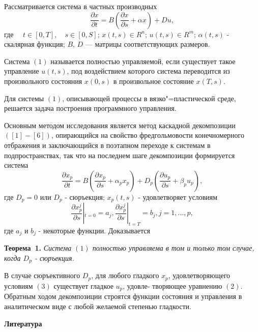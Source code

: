 \vzmscaption

 Рассматривается система в частных производных
\begin{equation}
\frac{\partial x}{\partial t}=B(\frac{\partial x}{\partial s}+ \alpha x) + Du,
\end{equation}
 где $\quad t\in [0,T],\quad s\in [0,S]$; $x(t,s)\in R ^{n}$; $u(t,s)\in R^{m}$; $\alpha(t,s)$ - скалярная функция; $B$, $D$ --- матрицы соответствующих размеров.

Система $(1)$ называется полностью управляемой, если существует такое управление $u(t,s)$,
под воздействием которого система переводится  из произвольного состояния $x(0,s)$ в произвольное состояние $x(T,s)$.

Для системы $(1)$, описывающей процессы в вязко"=пластической среде, решается задача построения программного управления.


Основным методом исследования является метод каскадной декомпозиции $([1]-[6])$, опирающийся на свойство фредгольмовости конечномерного отбражения и заключающийся в поэтапном переходе к системам в подпространствах, так что на
последнем шаге декомпозиции формируется система
\begin{equation}
\frac{\partial x_{p}}{\partial t}=B(\frac{\partial x_{p}}{\partial s}+ \alpha_{p} x_{p}) + D_{p}(\frac{\partial u_{p}}{\partial s}+ \beta_{p} u_{p}),
\end{equation}
где $D_{p}=0$ или $D_{p}$ - сюръекция; $x_{p}(t,s)$ - удовлетворяет условиям
\begin{equation}
\frac{\partial x^{j}_{p}}{\partial s}|_{t=0} = a_{j}, \frac{\partial x^{j}_{p}}{\partial s}|_{t=T} = b_{j}, j=1,...,p,
\end{equation}
где $a_{j}$ и $b_{j}$ - некоторые функции. Доказывается

\textbf{Теорема~1.} {\it Система $(1)$ полностью управляема в том и только том случае, когда $D_{p}$ - сюръекция.}


В случае сюръективного $D_{p}$, для любого гладкого $x_{p}$, удовлетворяющего
условиям $(3)$ существует гладкое $u_{p}$, удовле-
творяющее уравнению $(2)$. Обратным ходом декомпозиции строятся функции состояния
и управления в аналитическом виде  с любой желаемой степенью гладкости.

\smallskip \centerline {\bf Литература} \nopagebreak


